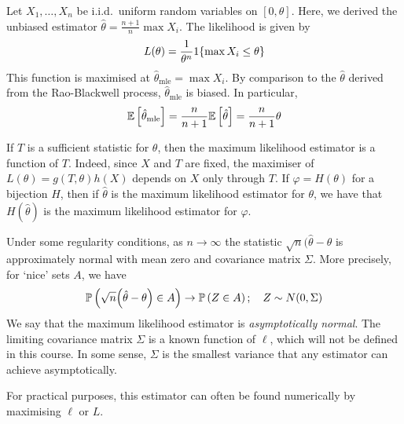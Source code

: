 \begin{example}
	Let \( X_1, \dots, X_n \) be i.i.d.\ uniform random variables on \( [0,\theta] \).
	Here, we derived the unbiased estimator \( \hat \theta = \frac{n+1}{n} \max X_i \).
	The likelihood is given by
	\[ L(\theta) = \frac{1}{\theta^n} 1\qty{\max X_i \leq \theta} \]
	This function is maximised at \( \hat \theta_{\mathrm{mle}} = \max X_i \).
	By comparison to the \( \hat \theta \) derived from the Rao-Blackwell process, \( \hat \theta_{\mathrm{mle}} \) is biased.
	In particular,
	\[ \mathbb{E}\left[{\hat \theta_{\mathrm{mle}}}\right] = \frac{n}{n+1} \mathbb{E}\left[{\hat \theta}\right] = \frac{n}{n+1} \theta \]
\end{example}
\begin{remark}
	If \( T \) is a sufficient statistic for \( \theta \), then the maximum likelihood estimator is a function of \( T \).
	Indeed, since \( X \) and \( T \) are fixed, the maximiser of \( L(\theta) = g(T,\theta) h(X) \) depends on \( X \) only through \( T \).
	If \( \varphi = H(\theta) \) for a bijection \( H \), then if \( \hat \theta \) is the maximum likelihood estimator for \( \theta \), we have that \( H(\hat \theta) \) is the maximum likelihood estimator for \( \varphi \).

	Under some regularity conditions, as \( n \to \infty \) the statistic \( \sqrt{n} (\hat \theta - \theta \) is approximately normal with mean zero and covariance matrix \( \Sigma \).
	More precisely, for `nice' sets \( A \), we have
	\[ \mathbb{P}\left({\sqrt{n} \qty(\hat \theta - \theta) \in A}\right) \to \mathbb{P}\left({Z \in A}\right);\quad Z \sim N(0, \Sigma) \]
	We say that the maximum likelihood estimator is \textit{asymptotically normal}.
	The limiting covariance matrix \( \Sigma \) is a known function of \( \ell \), which will not be defined in this course.
	In some sense, \( \Sigma \) is the smallest variance that any estimator can achieve asymptotically.

	For practical purposes, this estimator can often be found numerically by maximising \( \ell \) or \( L \).
\end{remark}
